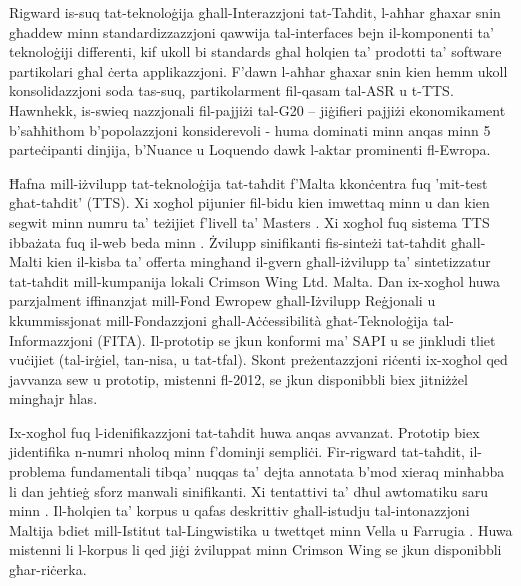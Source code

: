 \documentclass[]{../../metanetpaper}
\begin{document}
\begin{multicols}{2}
Rigward is-suq tat-teknoloġija għall-Interazzjoni tat-Taħdit, l-aħħar għaxar snin għaddew minn standardizzazzjoni qawwija tal-interfaces bejn il-komponenti ta’ teknoloġiji differenti, kif ukoll bi standards għal ħolqien ta’ prodotti ta’ software partikolari għal ċerta applikazzjoni. F’dawn l-aħħar għaxar snin kien hemm ukoll konsolidazzjoni soda tas-suq, partikolarment fil-qasam tal-ASR u t-TTS. Hawnhekk, is-swieq nazzjonali fil-pajjiżi tal-G20 – jiġifieri pajjiżi ekonomikament b'saħħithom b’popolazzjoni konsiderevoli - huma dominati minn anqas minn 5 parteċipanti dinjija, b’Nuance u Loquendo dawk l-aktar prominenti fl-Ewropa.

Ħafna mill-iżvilupp tat-teknoloġija tat-taħdit f'Malta kkonċentra fuq 'mit-test għat-taħdit' (TTS). Xi xogħol pijunier fil-bidu kien imwettaq minn \cite{Micallef:1997} u dan kien segwit minn numru ta’ teżijiet f’livell ta’ Masters \cite{Farrugia:2005}. Xi xogħol fuq sistema TTS ibbażata fuq il-web beda minn \cite{Buhagiar-Micallef:2008}.
Żvilupp sinifikanti fis-sinteżi tat-taħdit għall-Malti kien il-kisba ta’ offerta mingħand il-gvern għall-iżvilupp ta’ sintetizzatur tat-taħdit mill-kumpanija lokali Crimson Wing Ltd. Malta. Dan ix-xogħol huwa parzjalment iffinanzjat mill-Fond Ewropew għall-Iżvilupp Reġjonali u kkummissjonat mill-Fondazzjoni għall-Aċċessibilità għat-Teknoloġija tal-Informazzjoni (FITA). Il-prototip se jkun konformi ma’ SAPI u se jinkludi tliet vuċijiet (tal-irġiel, tan-nisa, u tat-tfal). Skont preżentazzjoni riċenti \cite{Borg-et-al:2011} ix-xogħol qed javvanza sew u prototip, mistenni fl-2012, se jkun disponibbli biex jitniżżel mingħajr ħlas.

Ix-xogħol fuq l-idenifikazzjoni tat-taħdit huwa anqas avvanzat. Prototip biex jidentifika n-numri nħoloq minn \cite{Calleja:2004} f’dominji sempliċi. Fir-rigward tat-taħdit, il-problema fundamentali tibqa’ nuqqas ta’ dejta annotata b’mod xieraq minħabba li dan jeħtieġ sforz manwali sinifikanti. Xi tentattivi ta’ dħul awtomatiku saru minn \cite{Psaila:2008}. Il-ħolqien ta’ korpus u qafas deskrittiv għall-istudju tal-intonazzjoni Maltija bdiet mill-Istitut tal-Lingwistika u twettqet minn Vella u Farrugia \cite{Vella-Farrugia:2006}. Huwa mistenni li l-korpus li qed jiġi żviluppat minn Crimson Wing se jkun disponibbli għar-riċerka.


\end{multicols}
\end{document}
